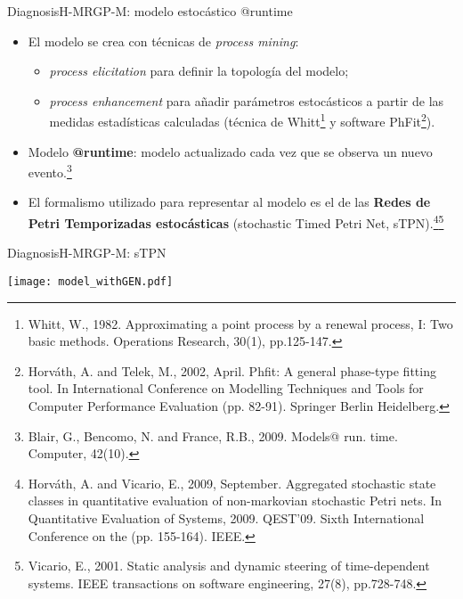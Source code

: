 \documentclass[9pt, handout]{beamer}
\begin{document}
      \begin{frame}{Diagnosis}{H-MRGP-M: modelo estocástico @runtime}
        \pause
        \begin{itemize}
          \item El modelo se crea con técnicas de \textit{process mining}:
          \pause
          \begin{itemize}
            \item \textit{process elicitation} para definir la topología del modelo;
            \pause
            \item \textit{process enhancement} para añadir parámetros estocásticos a partir de las medidas estadísticas calculadas (técnica de Whitt\footnote{Whitt, W., 1982. Approximating a point process by a renewal process, I: Two basic methods. Operations Research, 30(1), pp.125-147.} y software PhFit\footnote{Horváth, A. and Telek, M., 2002, April. Phfit: A general phase-type fitting tool. In International Conference on Modelling Techniques and Tools for Computer Performance Evaluation (pp. 82-91). Springer Berlin Heidelberg.}).
          \end{itemize}
          \pause
          \item Modelo \textbf{@runtime}: modelo actualizado cada vez que se observa un nuevo evento.\footnote{Blair, G., Bencomo, N. and France, R.B., 2009. Models@ run. time. Computer, 42(10).}
          \pause
          \item El formalismo utilizado para representar al modelo es el de las \textbf{Redes de Petri Temporizadas estocásticas} (stochastic Timed Petri Net, sTPN).\footnote{Horváth, A. and Vicario, E., 2009, September. Aggregated stochastic state classes in quantitative evaluation of non-markovian stochastic Petri nets. In Quantitative Evaluation of Systems, 2009. QEST'09. Sixth International Conference on the (pp. 155-164). IEEE.}\footnote{Vicario, E., 2001. Static analysis and dynamic steering of time-dependent systems. IEEE transactions on software engineering, 27(8), pp.728-748.}
        \end{itemize}
      \end{frame}
      
      \begin{frame}{Diagnosis}{H-MRGP-M: sTPN}
        \begin{center}
          \texttt{[image: model\_withGEN.pdf]}
        \end{center}
      \end{frame}
      
\end{document}
